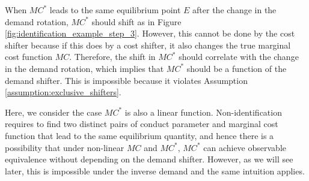 \documentclass[11pt, a4paper]{article}
\theoremstyle{remark}
\begin{document}
When $MC^{*}$ leads to the same equilibrium point $E$ after the change in the demand rotation, $MC^{*}$ should shift as in Figure \ref{fig:identification_example_step_3}.
However, this cannot be done by the cost shifter because if this does by a cost shifter, it also changes the true marginal cost function $MC$.
Therefore, the shift in $MC^{*}$ should correlate with the change in the demand rotation, which implies that $MC^{*}$ should be a function of the demand shifter.
This is impossible because it violates Assumption \ref{assumption:exclusive_shifters}.

Here, we consider the case $MC^{*}$ is also a linear function.
Non-identification requires to find two distinct pairs of conduct parameter and marginal cost function that lead to the same equilibrium quantity, and hence there is a possibility that under non-linear $MC$ and $MC^{*}$, $MC^{*}$ can achieve observable equivalence without depending on the demand shifter.
However, as we will see later, this is impossible under the inverse demand and the same intuition applies.
\end{document}
